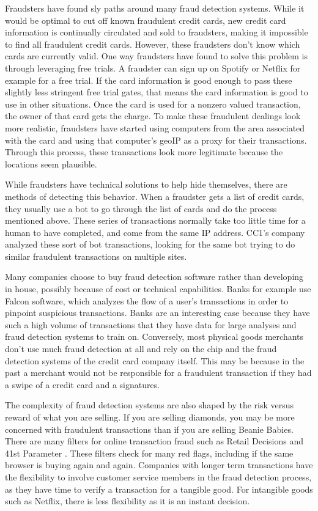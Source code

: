 \documentclass[midd]{thesis}
\begin{document}
Fraudsters have found sly paths around many fraud detection systems. While it would be optimal to cut off known fraudulent credit cards, new credit card information is continually circulated and sold to fraudsters, making it impossible to find all fraudulent credit cards. However, these fraudsters don't know which cards are currently valid. One way fraudsters have found to solve this problem is through leveraging free trials. A fraudster can sign up on Spotify or Netflix for example for a free trial. If the card information is good enough to pass these slightly less stringent free trial gates, that means the card information is good to use in other situations. Once the card is used for a nonzero valued transaction, the owner of that card gets the charge. To make these fraudulent dealings look more realistic, fraudsters have started using computers from the area associated with the card and using that computer's geoIP as a proxy for their transactions. Through this process, these transactions look more legitimate because the locations seem plausible. 

While fraudsters have technical solutions to help hide themselves, there are methods of detecting this behavior. When a fraudster gets a list of credit cards, they usually use a bot to go through the list of cards and do the process mentioned above. These series of transactions normally take too little time for a human to have completed, and come from the same IP address. CC1's company analyzed these sort of bot transactions, looking for the same bot trying to do similar fraudulent transactions on multiple sites. 

Many companies choose to buy fraud detection software rather than developing in house, possibly because of cost or technical capabilities. Banks for example use Falcon software, which analyzes the flow of a user's transactions in order to pinpoint suspicious transactions. Banks are an interesting case because they have such a high volume of transactions that they have data for large analyses and fraud detection systems to train on. Conversely, most physical goods merchants don't use much fraud detection at all and rely on the chip and the fraud detection systems of the credit card company itself. This may be because in the past a merchant would not be responsible for a fraudulent transaction if they had a swipe of a credit card and a signatures. 

The complexity of fraud detection systems are also shaped by the risk versus reward of what you are selling. If you are selling diamonds, you may be more concerned with fraudulent transactions than if you are selling Beanie Babies. There are many filters for online transaction fraud such as Retail Decisions \cite{Retail} and 41st Parameter \cite{41st}. These filters check for many red flags, including if the same browser is buying again and again. Companies with longer term transactions have the flexibility to involve customer service members in the fraud detection process, as they have time to verify a transaction for a tangible good. For intangible goods such as Netflix, there is less flexibility as it is an instant decision. 
\end{document}
